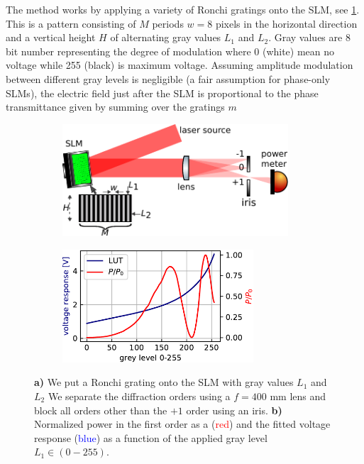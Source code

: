 The method works by applying a variety of Ronchi gratings onto the SLM, see \cref{fig:LUTCalibrationSetup}.
This is a pattern consisting of $M$ periods $w=8$ pixels in the horizontal direction and a vertical height $H$ of alternating gray values $L_1$ and $L_2$.
Gray values are 8 bit number representing the degree of modulation where 0 (white) mean no voltage while 255 (black) is maximum voltage. 
Assuming amplitude modulation between different gray levels is negligible (a fair assumption for phase-only SLMs), the electric field just after the SLM is proportional to the phase transmittance given by summing over the gratings $m$ \cite{Zhang1994}

\begin{figure}
	\begin{subfigure}{.54\linewidth}
		\flushleft
		\includegraphics[height=4.2cm]{figures/LUTcalibrationSetup.pdf}
		\caption{}
		\label{fig:LUTCalibrationSetup}
	\end{subfigure}
	\hfill
	\begin{subfigure}{.44\linewidth}
		\flushright
		\includegraphics[height=4.2cm]{figures/LUTplot.pdf}
		\caption{}
		\label{fig:LUTcalibration}
	\end{subfigure}
	\caption{\textbf{a)} We put a Ronchi grating onto the SLM with gray values $L_1$ and $L_2$ We separate the diffraction orders using a $f=400$ mm lens and block all orders other than the $+1$ order using an iris. 
		\textbf{b)} Normalized power in the first order as a (\textcolor{red}{red}) and the fitted voltage response (\textcolor{blue}{blue}) as a function of the applied gray level $L_1 \in (0-255)$.}
\end{figure}

